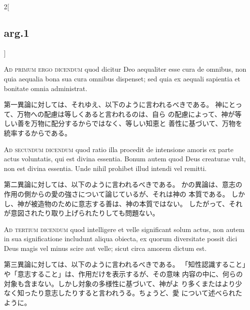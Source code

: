 \documentclass[paper=a4paper,fontsize=10pt,jafontsize=9pt,titlepage]{jlreq}
\begin{document}
\begin{paracol}{2}[\subsection{arg.1}]
\switchcolumn*[\subsection{ad.1}]


{\scshape Ad primum ergo dicendum} quod dicitur Deo
aequaliter esse cura de omnibus, non quia aequalia bona sua cura omnibus
dispenset; sed quia ex aequali sapientia et bonitate omnia administrat.

\switchcolumn

第一異論に対しては、それゆえ、以下のように言われるべきである。
神にとって、万物への配慮は等しくあると言われるのは、自ら
 の配慮によって、神が等しい善を万物に配分するからではなく、等しい知恵と
 善性に基づいて、万物を統率するからである。

\switchcolumn*[\subsection{ad.2}]


{\scshape Ad secundum dicendum} quod ratio illa procedit
de intensione amoris ex parte actus voluntatis, qui est divina
essentia. Bonum autem quod Deus creaturae vult, non est divina
essentia. Unde nihil prohibet illud intendi vel remitti.

\switchcolumn

第二異論に対しては、以下のように言われるべきである。
かの異論は、意志の作用の側からの愛の強さについて論じているが、それは神の
 本質である。
しかし、神が被造物のために意志する善は、神の本質ではない。
したがって、それが意図されたり取り上げられたりしても問題ない。

\switchcolumn*[\subsection{ad.3}]


{\scshape Ad tertium dicendum} quod intelligere et velle
significant solum actus, non autem in sua significatione includunt
aliqua obiecta, ex quorum diversitate possit dici Deus magis vel minus
scire aut velle; sicut circa amorem dictum est.

\switchcolumn

第三異論に対しては、以下のように言われるべきである。
「知性認識すること」や「意志すること」は、作用だけを表示するが、その意味
 内容の中に、何らの対象も含まない。しかし対象の多様性に基づいて、神がよ
 り多くまたはより少なく知ったり意志したりすると言われうる。ちょうど、愛
 について述べられたように。

\end{paracol}
\newpage
\end{document}
